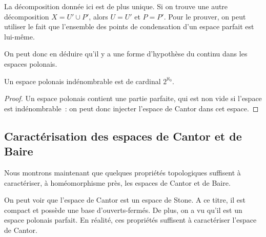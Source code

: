 \begin{remark}
  La décomposition donnée ici est de plus unique. Si on trouve une autre
  décomposition $X = U' \cup P'$, alors $U = U'$ et $P = P'$. Pour le prouver,
  on peut utiliser le fait que l'ensemble des points de condensation d'un
  espace parfait est lui-même.
\end{remark}

On peut donc en déduire qu'il y a une forme d'hypothèse du continu dans les
espaces polonais.

\begin{corollary}
  Un espace polonais indénombrable est de cardinal $2^{\aleph_0}$.
\end{corollary}

\begin{proof}
  Un espace polonais contient une partie parfaite, qui est non vide si l'espace
  est indénombrable~: on peut donc injecter l'espace de Cantor dans cet espace.
\end{proof}

\subsection{Caractérisation des espaces de Cantor et de Baire}

Nous montrons maintenant que quelques propriétés topologiques suffisent à
caractériser, à homéomorphisme près, les espaces de Cantor et de Baire.

On peut voir que l'espace de Cantor est un espace de Stone. A ce titre, il est
compact et possède une base d'ouverts-fermés. De plus, on a vu qu'il est un
espace polonais parfait. En réalité, ces propriétés suffisent à caractériser
l'espace de Cantor.

